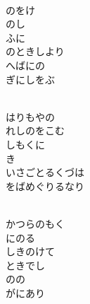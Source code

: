 \documentclass[10pt,b5j]{tarticle} %
\begin{document}
\vspace{1.5em} %
\newcommand{\linespace}{0.5em} %
\newcommand{\blocksize}{0.5\hsize} %
\newcommand{\itemmargin}{3em} %
\begin{enumerate} %
    \setlength{\itemindent}{\itemmargin} %
    \begin{minipage}[c]{\blocksize}
    
        \vspace{\linespace}
        \item~\\
        のをけ\\
        のし\\
        ふに\\
        のときしより\\
        へばにの\\
        ぎにしをぶ
        
    \end{minipage}
    \begin{minipage}[c]{\blocksize}
        
        \vspace{\linespace}
        \item~\\
        はりもやの\\
        れしのをこむ\\
        しもくに\\
        き\\
        いさごとるくづは\\
        をばめぐりるなり
        
    \end{minipage}
    \begin{minipage}[c]{\blocksize}
        
        \vspace{\linespace}
        \item~\\
        かつらのもく\\
        にのる\\
        しきのけて\\
        ときでし\\
        のの\\
        がにあり
        

\end{minipage}
\end{enumerate}
\end{document}
